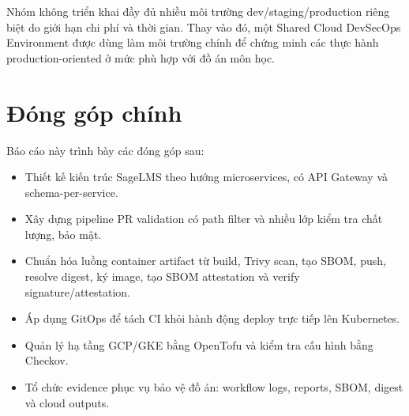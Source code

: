 Nhóm không triển khai đầy đủ nhiều môi trường dev/staging/production riêng biệt do giới hạn chi phí và thời gian. Thay vào đó, một Shared Cloud DevSecOps Environment được dùng làm môi trường chính để chứng minh các thực hành production-oriented ở mức phù hợp với đồ án môn học.

\section{Đóng góp chính}

Báo cáo này trình bày các đóng góp sau:

\begin{itemize}
  \item Thiết kế kiến trúc SageLMS theo hướng microservices, có API Gateway và schema-per-service.
  \item Xây dựng pipeline PR validation có path filter và nhiều lớp kiểm tra chất lượng, bảo mật.
  \item Chuẩn hóa luồng container artifact từ build, Trivy scan, tạo SBOM, push, resolve digest, ký image, tạo SBOM attestation và verify signature/attestation.
  \item Áp dụng GitOps để tách CI khỏi hành động deploy trực tiếp lên Kubernetes.
  \item Quản lý hạ tầng GCP/GKE bằng OpenTofu và kiểm tra cấu hình bằng Checkov.
  \item Tổ chức evidence phục vụ bảo vệ đồ án: workflow logs, reports, SBOM, digest và cloud outputs.
\end{itemize}
